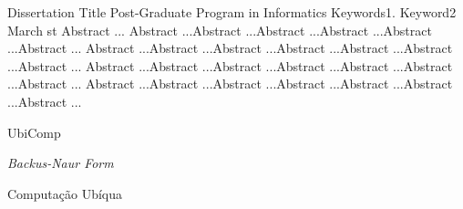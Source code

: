 \documentclass[diss]{mdtufsm}
\begin{document}
\begin{englishabstract}
{Dissertation Title}
{Post-Graduate Program in Informatics}
{Keywords1. Keyword2}
{March}
{st}
Abstract ... Abstract ...Abstract ...Abstract ...Abstract ...Abstract ...Abstract ...
Abstract ...Abstract ...Abstract ...Abstract ...Abstract ...Abstract ...Abstract ...
Abstract ...Abstract ...Abstract ...Abstract ...Abstract ...Abstract ...Abstract ...
Abstract ...Abstract ...Abstract ...Abstract ...Abstract ...Abstract ...Abstract ...
\end{englishabstract}



\listoftables

\listofappendix

\listofannex

\begin{listofabbrv}{UbiComp}
   \item [BNF] \textit{Backus-Naur Form}
   \item [UbiComp] Computação Ubíqua
\end{listofabbrv}
\end{document}
